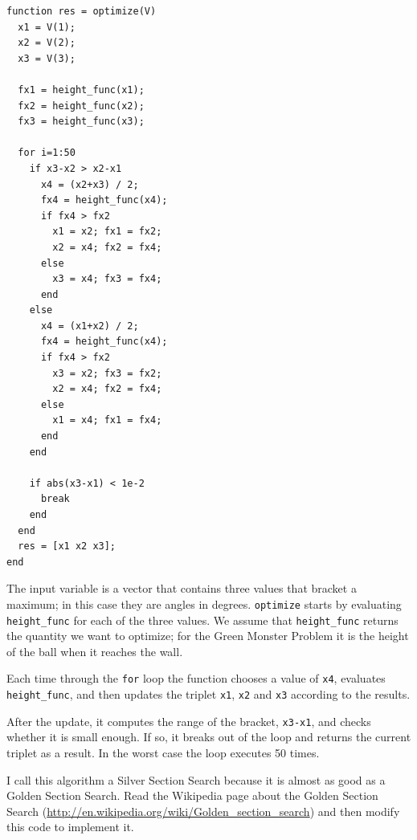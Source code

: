 \documentclass{book}
\begin{document}
\begin{verbatim}
function res = optimize(V)
  x1 = V(1);
  x2 = V(2);
  x3 = V(3);
  
  fx1 = height_func(x1);
  fx2 = height_func(x2);
  fx3 = height_func(x3);
  
  for i=1:50
    if x3-x2 > x2-x1
      x4 = (x2+x3) / 2;
      fx4 = height_func(x4);
      if fx4 > fx2
        x1 = x2; fx1 = fx2;
        x2 = x4; fx2 = fx4;
      else
        x3 = x4; fx3 = fx4;
      end
    else
      x4 = (x1+x2) / 2;
      fx4 = height_func(x4);
      if fx4 > fx2
        x3 = x2; fx3 = fx2;
        x2 = x4; fx2 = fx4;
      else
        x1 = x4; fx1 = fx4;
      end
    end

    if abs(x3-x1) < 1e-2
      break
    end
  end
  res = [x1 x2 x3];
end
\end{verbatim}

The input variable is a vector that contains three values that bracket
a maximum; in this case they are angles in degrees. {\tt optimize}
starts by evaluating {\tt height\_func} for each of the three values.
We assume that {\tt height\_func} returns the quantity we want to
optimize; for the Green Monster Problem it is the height of
the ball when it reaches the wall.

Each time through the {\tt for} loop the function chooses a value
of {\tt x4}, evaluates {\tt height\_func}, and then updates the
triplet {\tt x1}, {\tt x2} and {\tt x3} according to the results.

After the update, it computes the range of the bracket, {\tt x3-x1},
and checks whether it is small enough. If so, it breaks out of
the loop and returns the current triplet as a result. In the
worst case the loop executes 50 times.

\begin{ex}
I call this algorithm a Silver Section Search because it is almost as
good as a Golden Section Search. Read the Wikipedia page about the
Golden Section Search
(\url{http://en.wikipedia.org/wiki/Golden_section_search}) and then
modify this code to implement it.
\end{ex}
\end{document}
